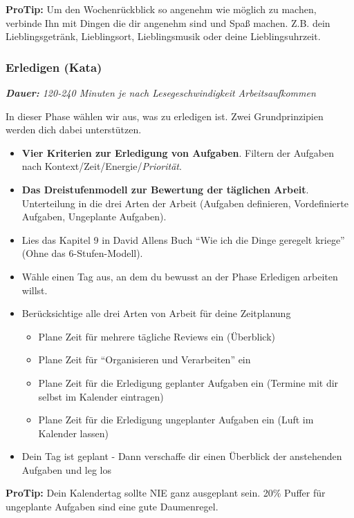 \documentclass[
  ngerman,
  paper=a4,
,captions=tableheading
]{scrartcl}
\providecommand{\tightlist}{%
  \setlength{\itemsep}{0pt}\setlength{\parskip}{0pt}}
\begin{document}
\textbf{ProTip:} Um den Wochenrückblick so angenehm wie möglich zu
machen, verbinde Ihn mit Dingen die dir angenehm sind und Spaß machen.
Z.B. dein Lieblingsgetränk, Lieblingsort, Lieblingsmusik oder deine
Lieblingsuhrzeit.

\hypertarget{erledigen-kata}{%
\subsubsection{Erledigen (Kata)}\label{erledigen-kata}}

\emph{\textbf{Dauer:} 120-240 Minuten je nach Lesegeschwindigkeit
Arbeitsaufkommen}

In dieser Phase wählen wir aus, was zu erledigen ist. Zwei
Grundprinzipien werden dich dabei unterstützen.

\begin{itemize}
\item
  \textbf{Vier Kriterien zur Erledigung von Aufgaben}. Filtern der
  Aufgaben nach Kontext/Zeit/Energie/\emph{Priorität}.
\item
  \textbf{Das Dreistufenmodell zur Bewertung der täglichen Arbeit}.
  Unterteilung in die drei Arten der Arbeit (Aufgaben definieren,
  Vordefinierte Aufgaben, Ungeplante Aufgaben).
\item
  Lies das Kapitel 9 in David Allens Buch ``Wie ich die Dinge geregelt
  kriege'' (Ohne das 6-Stufen-Modell).
\item
  Wähle einen Tag aus, an dem du bewusst an der Phase Erledigen arbeiten
  willst.
\item
  Berücksichtige alle drei Arten von Arbeit für deine Zeitplanung

  \begin{itemize}
  \tightlist
  \item
    Plane Zeit für mehrere tägliche Reviews ein (Überblick)
  \item
    Plane Zeit für ``Organisieren und Verarbeiten'' ein
  \item
    Plane Zeit für die Erledigung geplanter Aufgaben ein (Termine mit
    dir selbst im Kalender eintragen)
  \item
    Plane Zeit für die Erledigung ungeplanter Aufgaben ein (Luft im
    Kalender lassen)
  \end{itemize}
\item
  Dein Tag ist geplant - Dann verschaffe dir einen Überblick der
  anstehenden Aufgaben und leg los
\end{itemize}

\textbf{ProTip:} Dein Kalendertag sollte NIE ganz ausgeplant sein. 20\%
Puffer für ungeplante Aufgaben sind eine gute Daumenregel.
\end{document}
